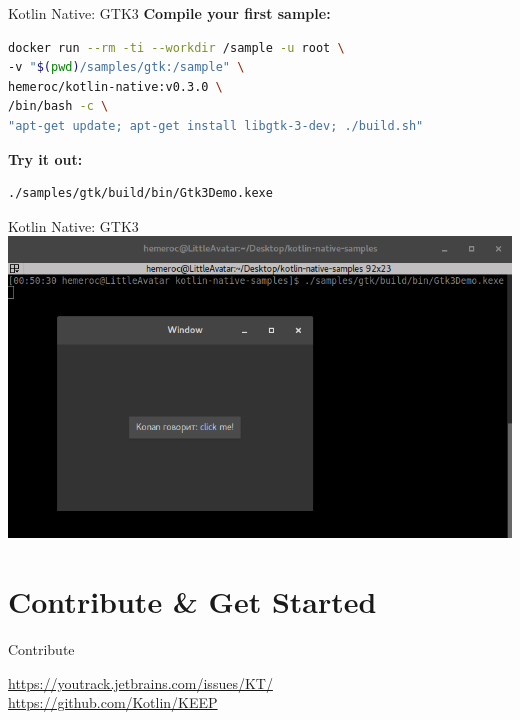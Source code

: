 \begin{frame}[fragile]{Kotlin Native: GTK3}
	\textbf{Compile your first sample:}\\\vspace{.5\baselineskip}
\begin{lstlisting}[language=bash,basicstyle=\ttfamily\small]
docker run --rm -ti --workdir /sample -u root \
-v "$(pwd)/samples/gtk:/sample" \
hemeroc/kotlin-native:v0.3.0 \
/bin/bash -c \
"apt-get update; apt-get install libgtk-3-dev; ./build.sh"
\end{lstlisting}
	\textbf{Try it out:}\\\vspace{.5\baselineskip}
\begin{lstlisting}[language=bash,basicstyle=\ttfamily\small]
./samples/gtk/build/bin/Gtk3Demo.kexe
\end{lstlisting}
\end{frame}

\begin{frame}[fragile]{Kotlin Native: GTK3}
	\includegraphics[width=0.85\paperwidth]{figures/gtk3}
\end{frame}

\section{Contribute \& Get Started}

\begin{frame}{Contribute}
	\begin{center}
		\LARGE \href{https://youtrack.jetbrains.com/issues/KT/}{https://youtrack.jetbrains.com/issues/KT/}\\
		\href{https://github.com/Kotlin/KEEP}{https://github.com/Kotlin/KEEP}
	\end{center}
\end{frame}

